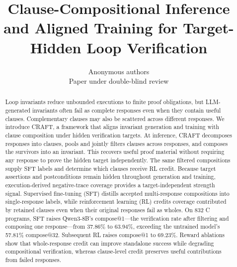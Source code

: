 \documentclass{article}
\title{Clause-Compositional Inference and Aligned Training
for Target-Hidden Loop Verification}
\author{
  Anonymous authors\\
  Paper under double-blind review
}
\begin{document}
\maketitle

\begin{abstract}
Loop invariants reduce unbounded executions to finite proof obligations, but
LLM-generated invariants often fail as complete responses even when they
contain useful clauses.  Complementary clauses may also be scattered across
different responses.  We introduce CRAFT, a framework that aligns invariant
generation and training with clause composition under hidden verification
targets.  At inference, CRAFT decomposes responses
into clauses, pools and jointly filters clauses across responses, and composes
the survivors into an invariant.  This recovers useful proof material without
requiring any response to prove the hidden target independently.
The same filtered compositions supply SFT labels and determine which clauses
receive RL credit.  Because target assertions
and postconditions remain hidden throughout generation and training,
execution-derived negative-trace coverage provides a target-independent
strength signal.  Supervised fine-tuning (SFT) distills accepted multi-response
compositions into single-response labels, while reinforcement learning (RL)
credits coverage contributed by retained clauses even when their original
responses fail as wholes.  On 832 C programs, SFT raises Qwen3-8B's
compose@1---the verification rate after filtering and composing one
response---from 37.86\% to 63.94\%, exceeding the untrained model's 57.81\%
compose@32.  Subsequent RL raises compose@1 to 69.23\%.  Reward ablations show
that whole-response credit can improve standalone success while degrading
compositional verification, whereas clause-level credit preserves useful
contributions from failed responses.
\end{abstract}







\clearpage





\newpage
\appendix

\end{document}
